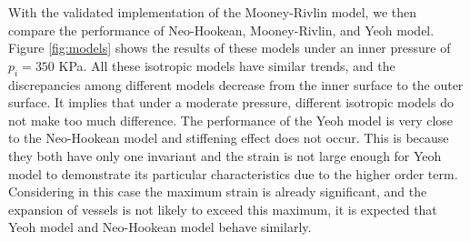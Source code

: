 With the validated implementation of the Mooney-Rivlin model, we then compare the performance of Neo-Hookean, Mooney-Rivlin, and Yeoh model. Figure \ref{fig:models} shows the results of these models under an inner pressure of $p_i = 350$ KPa. All these isotropic models have similar trends, and the discrepancies among different models decrease from the inner surface to the outer surface. It implies that under a moderate pressure, different isotropic models do not make too much difference. The performance of the Yeoh model is very close to the Neo-Hookean model and stiffening effect does not occur. This is because they both have only one invariant and the strain is not large enough for Yeoh model to demonstrate its particular characteristics due to the higher order term. Considering in this case the maximum strain is already significant, and the expansion of vessels is not likely to exceed this maximum, it is expected that Yeoh model and Neo-Hookean model behave similarly.

